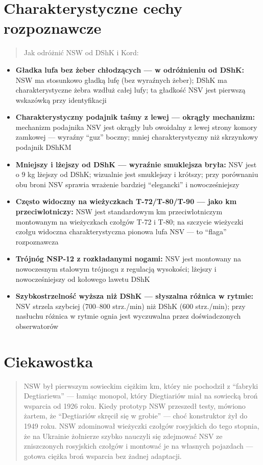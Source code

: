 \documentclass[12pt,openany,oneside]{book}
\providecommand{\tightlist}{%
  \setlength{\itemsep}{0pt}\setlength{\parskip}{0pt}}
\begin{document}
\section{Charakterystyczne cechy
rozpoznawcze}\label{charakterystyczne-cechy-rozpoznawcze-59}

\begin{quote}
Jak odróżnić NSW od DShK i Kord:
\end{quote}

\begin{itemize}
\tightlist
\item
  \textbf{Gładka lufa bez żeber chłodzących --- w odróżnieniu od DShK:}
  NSW ma stosunkowo gładką lufę (bez wyraźnych żeber); DShK ma
  charakterystyczne żebra wzdłuż całej lufy; ta gładkość NSV jest
  pierwszą wskazówką przy identyfikacji
\item
  \textbf{Charakterystyczny podajnik taśmy z lewej --- okrągły
  mechanizm:} mechanizm podajnika NSV jest okrągły lub owoidalny z lewej
  strony komory zamkowej --- wyraźny ``guz'' boczny; mniej
  charakterystyczny niż skrzynkowy podajnik DShKM
\item
  \textbf{Mniejszy i lżejszy od DShK --- wyraźnie smuklejsza bryła:} NSV
  jest o 9 kg lżejszy od DShK; wizualnie jest smuklejszy i krótszy; przy
  porównaniu obu broni NSV sprawia wrażenie bardziej ``elegancki'' i
  nowocześniejszy
\item
  \textbf{Często widoczny na wieżyczkach T-72/T-80/T-90 --- jako km
  przeciwlotniczy:} NSW jest standardowym km przeciwlotniczym montowanym
  na wieżyczkach czołgów T-72 i T-80; na szczycie wieżyczki czołgu
  widoczna charakterystyczna pionowa lufa NSV --- to ``flaga''
  rozpoznawcza
\item
  \textbf{Trójnóg NSP-12 z rozkładanymi nogami:} NSV jest montowany na
  nowoczesnym stalowym trójnogu z regulacją wysokości; lżejszy i
  nowocześniejszy od kołowego lawetu DShK
\item
  \textbf{Szybkostrzelność wyższa niż DShK --- słyszalna różnica w
  rytmie:} NSV strzela szybciej (700--800 strz./min) niż DShK (600
  strz./min); przy nasłuchu różnica w rytmie ognia jest wyczuwalna przez
  doświadczonych obserwatorów
\end{itemize}

\section{Ciekawostka}\label{ciekawostka-59}

\begin{quote}
NSW był pierwszym sowieckim ciężkim km, który nie pochodził z ``fabryki
Degtiariewa'' --- łamiąc monopol, który Diegtiariów miał na sowiecką
broń wsparcia od 1926 roku. Kiedy prototyp NSW przeszedł testy, mówiono
żartem, że ``Degtiariów skręcił się w grobie'' --- choć konstruktor żył
do 1949 roku. NSW zdominował wieżyczki czołgów rosyjskich do tego
stopnia, że na Ukrainie żołnierze szybko nauczyli się zdejmować NSV ze
zniszczonych rosyjskich czołgów i montować je na własnych pojazdach ---
gotowa ciężka broń wsparcia bez żadnej adaptacji.
\end{quote}
\end{document}

